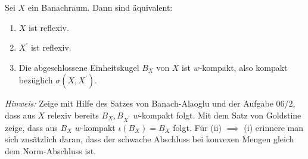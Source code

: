 \begin{exercise}
Sei $X$ ein Banachraum. Dann sind äquivalent:
\begin{enumerate}[label = \roman*)]
  \item  $X$ ist reflexiv.
  \item $X^{\prime}$ ist reflexiv.
  \item Die abgeschlossene Einheitskugel $B_X$ von $X$ ist $w$-kompakt, also
  kompakt bezüglich $\sigma(X,X^{\prime})$.
\end{enumerate}
\textit{Hinweis:} Zeige mit Hilfe des Satzes von Banach-Alaoglu und der Aufgabe 06/2,
dass aus $X$ relexiv bereits $B_X, B_{X^{\prime}}$ $w$-kompakt folgt. Mit dem Satz
von Goldstine zeige, dass aus $B_X$ $w$-kompakt $\iota(B_X) = B_X$ folgt.
Für (ii) $\implies$ (i) erinnere man sich zusätzlich daran, dass der schwache
Abschluss bei konvexen Mengen gleich dem Norm-Abschluss ist.
\end{exercise}
